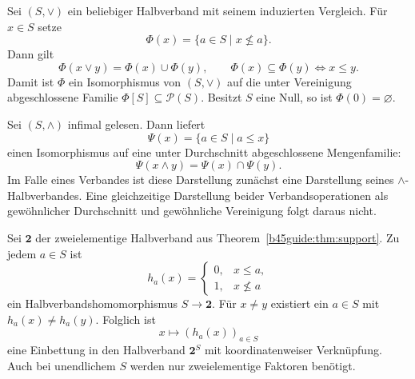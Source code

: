 \begin{theorem}
\label{b45guide:thm:union-representation}
Sei $(S,\vee)$ ein beliebiger Halbverband mit seinem induzierten
Vergleich. Für $x\in S$ setze
\[
 \Phi(x)=\{a\in S\mid x\not\leq a\}.
\]
Dann gilt
\[
 \Phi(x\vee y)=\Phi(x)\cup\Phi(y),\qquad
 \Phi(x)\subseteq\Phi(y)\iff x\leq y .
\]
Damit ist $\Phi$ ein Isomorphismus von $(S,\vee)$ auf die
unter Vereinigung abgeschlossene Familie $\Phi[S]\subseteq\mathcal P(S)$.
Besitzt $S$ eine Null, so ist $\Phi(0)=\varnothing$.
\end{theorem}

\begin{theorem}
\label{b45guide:thm:intersection-representation}
Sei $(S,\wedge)$ infimal gelesen. Dann liefert
\[
 \Psi(x)=\{a\in S\mid a\leq x\}
\]
einen Isomorphismus auf eine unter Durchschnitt abgeschlossene
Mengenfamilie:
\[
 \Psi(x\wedge y)=\Psi(x)\cap\Psi(y).
\]
Im Falle eines Verbandes ist diese Darstellung zunächst eine
Darstellung seines $\wedge$-Halbverbandes. Eine gleichzeitige
Darstellung beider Verbandsoperationen als gewöhnlicher
Durchschnitt und gewöhnliche Vereinigung folgt daraus nicht.
\end{theorem}

\begin{theorem}
\label{b45guide:thm:two-separation}
Sei $\mathbf2$ der zweielementige Halbverband aus
Theorem~\ref{b45guide:thm:support}. Zu jedem $a\in S$ ist
\[
 h_a(x)=
 \begin{cases}
  0,&x\leq a,\\
  1,&x\not\leq a
 \end{cases}
\]
ein Halbverbandshomomorphismus $S\to\mathbf2$.
Für $x\ne y$ existiert ein $a\in S$ mit $h_a(x)\ne h_a(y)$.
Folglich ist
\[
 x\longmapsto(h_a(x))_{a\in S}
\]
eine Einbettung in den Halbverband $\mathbf2^S$ mit
koordinatenweiser Verknüpfung. Auch bei unendlichem $S$
werden nur zweielementige Faktoren benötigt.
\end{theorem}
